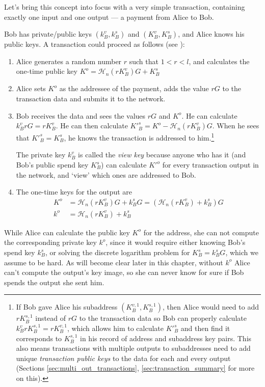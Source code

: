 Let’s bring this concept into focus with a very simple transaction, containing exactly one input and one output --- a payment from Alice to Bob.

Bob has private/public keys $(k_B^v, k_B^s)$ and $(K_B^v, K_B^s)$, and Alice knows his public keys. A transaction could proceed as follows (see  \cite{cryptoNoteWhitePaper}):


\begin{enumerate}
	\item Alice generates a random number $r$ such that $1 < r < l$, and calculates the one-time public key $K^o  = \mathcal{H}_n(r K_B^v)G + K_B^s$ 

	\item Alice sets $K^o$ as the addressee of the payment, adds the value $r G$ to the transaction data and submits it to the network.
	
	\item 	Bob receives the data and sees the values $r G$ and $K^o$. He can calculate $k_B^v r G = r K_B^v$. He can then calculate $K'^s_B = K^o - \mathcal{H}_n(r K_B^v)G$. When he sees that $K'^s_B = K_B^s$, he knows the transaction is addressed to him.\footnote{\label{subaddress_note}If Bob gave Alice his subaddress $(K_B^{v,1}, K_B^{s,1})$, then Alice would need to add $r K_B^{s,1}$ instead of $r G$ to the transaction data so Bob can properly calculate $k_B^v r K_B^{s,1} = r K_B^{v,1}$, which allows him to calculate $K'^s_B$ and then find it corresponds to $K^{s,1}_B$ in his record of address and subaddress key pairs. This also means transactions with multiple outputs to subaddresses need to add unique {\em transaction public keys} to the data for each and every output (Sections \ref{sec:multi_out_transactions}, \ref{sec:transaction_summary} for more on this).}
	
	The private key $k_B^v$ is called the {\em view key} because anyone who has it (and Bob’s public spend key $K_B^s$) can calculate $K'^o$ for every transaction output in the network, and ‘view’ which ones are addressed to Bob.
	
	\item The one-time keys for the output are
	\begin{align*}
		K^o &= \mathcal{H}_n(r K_B^v)G + k_B^s G = (\mathcal{H}_n(r K_B^v) + k_B^s)G  \\ 
		k^o &= \mathcal{H}_n(r K_B^v) + k_B^s
	\end{align*}
\end{enumerate}

While Alice can calculate the public key $K^o$ for the address, she can not compute the corresponding private key $k^o$, since it would require either knowing Bob’s spend key $k_B^s$, or solving the discrete logarithm problem for $K_B^s = k_B^s G$, which we assume to be hard. As will become clear later in this chapter, without $k^o$ Alice can't compute the output's key image, so she can never know for sure if Bob spends the output she sent him.
\\

